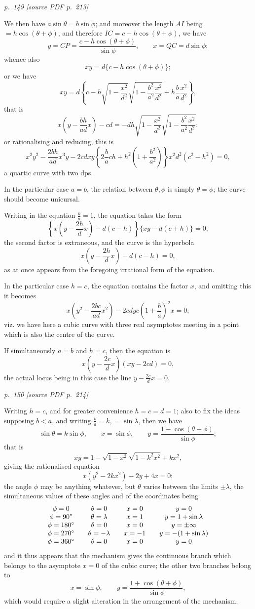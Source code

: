 \documentclass[11pt,a4paper]{article}
\newcommand{\sourcepage}[2]{%
  \bigskip
  \noindent\textit{p.~#1 [source PDF p.~#2]}%
  \par\smallskip
}
\begin{document}
\sourcepage{149}{213}

We then have \(a\sin\theta=b\sin\phi\); and moreover the length \(AI\) being
\(=h\cos(\theta+\phi)\), and therefore \(IC=c-h\cos(\theta+\phi)\), we have
\[
y=CP=\frac{c-h\cos(\theta+\phi)}{\sin\phi},\qquad
x=QC=d\sin\phi;
\]
whence also
\[
xy=d\{c-h\cos(\theta+\phi)\};
\]
or we have
\[
xy=d\left\{c-h\sqrt{1-\frac{x^2}{d^2}}\sqrt{1-\frac{b^2}{a^2}\frac{x^2}{d^2}}
       +h\frac{b}{a}\frac{x^2}{d^2}\right\},
\]
that is
\[
x\left(y-\frac{bh}{ad}x\right)-cd
=-dh\sqrt{1-\frac{x^2}{d^2}}\sqrt{1-\frac{b^2}{a^2}\frac{x^2}{d^2}}:
\]
or rationalising and reducing, this is
\[
x^2y^2-\frac{2bh}{ad}x^3y-2cdxy
\left\{2\frac{b}{a}ch+h^2\left(1+\frac{b^2}{a^2}\right)\right\}x^2
d^2(c^2-h^2)=0,
\]
a quartic curve with two dps.

In the particular case \(a=b\), the relation between \(\theta,\phi\) is simply
\(\theta=\phi\); the curve should become unicursal.

Writing in the equation \(\frac{b}{a}=1\), the equation takes the form
\[
\left\{x\left(y-\frac{2h}{d}x\right)-d(c-h)\right\}\{xy-d(c+h)\}=0;
\]
the second factor is extraneous, and the curve is the hyperbola
\[
x\left(y-\frac{2h}{d}x\right)-d(c-h)=0,
\]
as at once appears from the foregoing irrational form of the equation.

In the particular case \(h=c\), the equation contains the factor \(x\), and omitting
this it becomes
\[
x\left(y^2-\frac{2bc}{ad}x^2\right)-2cdy
c\left(1+\frac{b}{a}\right)^2x=0;
\]
viz. we have here a cubic curve with three real asymptotes meeting in a point which
is also the centre of the curve.

If simultaneously \(a=b\) and \(h=c\), then the equation is
\[
x\left(y-\frac{2c}{d}x\right)(xy-2cd)=0,
\]
the actual locus being in this case the line \(y-\frac{2c}{d}x=0\).

\sourcepage{150}{214}

Writing \(h=c\), and for greater convenience \(h=c=d=1\); also to fix the ideas
supposing \(b<a\), and writing \(\frac{b}{a}=k,=\sin\lambda\), then we have
\[
\sin\theta=k\sin\phi,\qquad x=\sin\phi,\qquad
y=\frac{1-\cos(\theta+\phi)}{\sin\phi};
\]
that is
\[
xy=1-\sqrt{1-x^2}\sqrt{1-k^2x^2}+kx^2,
\]
giving the rationalised equation
\[
x(y^2-2kx^2)-2y+4x=0;
\]
the angle \(\phi\) may be anything whatever, but \(\theta\) varies between the limits
\(\pm\lambda\), the simultaneous values of these angles and of the coordinates being
\[
\begin{array}{c@{\qquad}c@{\qquad}c@{\qquad}c}
\phi=0 & \theta=0 & x=0 & y=0\\
\phi=90^\circ & \theta=\lambda & x=1 & y=1+\sin\lambda\\
\phi=180^\circ & \theta=0 & x=0 & y=\pm\infty\\
\phi=270^\circ & \theta=-\lambda & x=-1 & y=-(1+\sin\lambda)\\
\phi=360^\circ & \theta=0 & x=0 & y=0
\end{array}
\]
and it thus appears that the mechanism gives the continuous branch which belongs
to the asymptote \(x=0\) of the cubic curve; the other two branches belong to
\[
x=\sin\phi,\qquad
y=\frac{1+\cos(\theta+\phi)}{\sin\phi},
\]
which would require a slight alteration in the arrangement of the mechanism.
\end{document}
